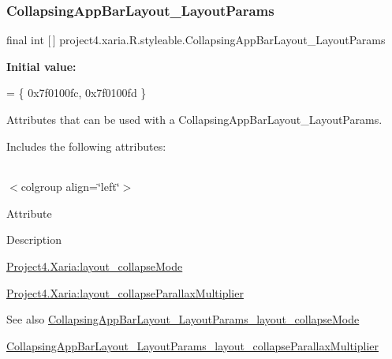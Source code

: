 \subsubsection{\texorpdfstring{Collapsing\+App\+Bar\+Layout\+\_\+\+Layout\+Params}{CollapsingAppBarLayout\_LayoutParams}}
{\footnotesize\ttfamily final int \mbox{[}$\,$\mbox{]} project4.\+xaria.\+R.\+styleable.\+Collapsing\+App\+Bar\+Layout\+\_\+\+Layout\+Params\hspace{0.3cm}{\ttfamily [static]}}

{\bfseries Initial value\+:}
\begin{DoxyCode}
= \{
            0x7f0100fc, 0x7f0100fd
        \}
\end{DoxyCode}
Attributes that can be used with a Collapsing\+App\+Bar\+Layout\+\_\+\+Layout\+Params. 

Includes the following attributes\+:

\tabulinesep=1mm
\begin{longtabu} spread 0pt [c]{*{0}{|X[-1]}|}
\hline
\end{longtabu}
$<$colgroup align=\char`\"{}left\char`\"{}$>$ 

Attribute

Description 

{\ttfamily \hyperlink{classproject4_1_1xaria_1_1R_1_1styleable_ad21b82d63a3f6941c5d827a4ca8d9dc3}{Project4.\+Xaria\+:layout\+\_\+collapse\+Mode}}

{\ttfamily \hyperlink{classproject4_1_1xaria_1_1R_1_1styleable_a04168d03b2bad3e184b322ab1bb66445}{Project4.\+Xaria\+:layout\+\_\+collapse\+Parallax\+Multiplier}}

\begin{DoxySeeAlso}{See also}
\hyperlink{classproject4_1_1xaria_1_1R_1_1styleable_ad21b82d63a3f6941c5d827a4ca8d9dc3}{Collapsing\+App\+Bar\+Layout\+\_\+\+Layout\+Params\+\_\+layout\+\_\+collapse\+Mode} 

\hyperlink{classproject4_1_1xaria_1_1R_1_1styleable_a04168d03b2bad3e184b322ab1bb66445}{Collapsing\+App\+Bar\+Layout\+\_\+\+Layout\+Params\+\_\+layout\+\_\+collapse\+Parallax\+Multiplier} 
\end{DoxySeeAlso}
\mbox{\label{classproject4_1_1xaria_1_1R_1_1styleable_ad21b82d63a3f6941c5d827a4ca8d9dc3}} 
